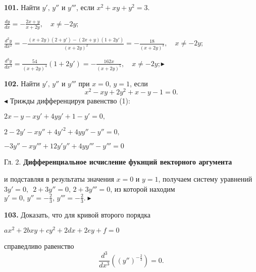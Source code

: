 \documentclass[12pt,a4paper]{book}
\begin{document}
    \textbf{101.} Найти $y', \, y''$ и $y'''$, если $x^2 + xy + y^2 = 3.$
    \begin{center}
        $\displaystyle\frac{dy}{dx} = - \frac{2x+y}{x+2y}, \quad x \neq - 2y;$
    \end{center}
    \begin{center}
        $\displaystyle\frac{d^2 y}{d x^2} = - \frac{(x+2y)(2+y')-(2x+y)(1+2y')}{(x+2y)^2} = - \frac{18}{(x+2y)^3}, \quad x \neq -2y;$
    \end{center}
    \begin{center}
        $\displaystyle\frac{d^3 y}{d x^3} = \frac{54}{(x+2y)^4} ( 1+ 2y') = - \frac{162x}{(x+2y)^5} , \quad x \neq -2y; \blacktriangleright$
    \end{center}
    
    \textbf{102.} Найти $y', \, y''$ и $y'''$ при $x = 0, \, y = 1$, если
    \setcounter{equation}{0}
    \begin{equation}
        x^2 - xy + 2y^2 + x - y - 1 = 0.
    \end{equation}
    $\blacktriangleleft$ Трижды дифференцируя равенство (1):
    \begin{center}
        $2x - y - xy' + 4yy' + 1 - y' = 0,$
    \begin{center}
        $2-2y'-xy'' + 4{y'}^2 + 4y y'' - y'' = 0,$
    \end{center}
    \end{center}
    \begin{center}
        $-3y'' - xy''' + 12y' y'' + 4y y''' - y''' = 0$
    \end{center}
    \newpage
    \begin{center}
        Гл. 2. \textbf{Дифференциальное исчисление фукнций векторного аргумента}
    \end{center}
    и подставляя в результаты значения $x=0$ и $y=1$, получаем систему уравнений $3y' = 0, \,$ $2+3y''= 0, \, 2+3y'''=0$, из которой находим $y' = 0, \, y'' = - \frac{2}{3}, \, y'''= -\frac{2}{3}. \blacktriangleright$
    
    \textbf{103.} Доказать, что для кривой второго порядка
    \begin{center}
        $ax^2 + 2bxy + cy^2 + 2 dx + 2ey + f = 0$
    \end{center}
    справедливо равенство
    \setcounter{equation}{0}
    \begin{equation}
        \frac{d^3}{dx^3} \left((y'')^{-\frac{2}{3}}\right) = 0.
    \end{equation}
    
\end{document}
